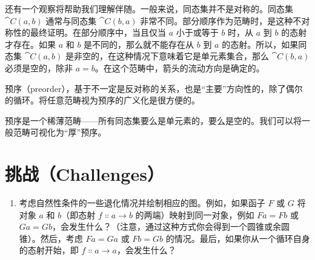 还有一个观察将帮助我们理解伴随。一般来说，同态集并不是对称的。同态集 $\cat{C}(a, b)$ 通常与同态集 $\cat{C}(b, a)$ 非常不同。部分顺序作为范畴时，是这种不对称性的最终证明。在部分顺序中，当且仅当 $a$ 小于或等于 $b$ 时，从 $a$ 到 $b$ 的态射才存在。如果 $a$ 和 $b$ 是不同的，那么就不能存在从 $b$ 到 $a$ 的态射。所以，如果同态集 $\cat{C}(a, b)$ 是非空的，在这种情况下意味着它是单元素集合，那么 $\cat{C}(b, a)$ 必须是空的，除非 $a = b$。在这个范畴中，箭头的流动方向是确定的。

预序（preorder），基于不一定是反对称的关系，也是“主要”方向性的，除了偶尔的循环。将任意范畴视为预序的广义化是很方便的。

预序是一个稀薄范畴——所有同态集要么是单元素的，要么是空的。我们可以将一般范畴可视化为“厚”预序。

\section{挑战（Challenges）}

\begin{enumerate}
  \tightlist
  \item
  考虑自然性条件的一些退化情况并绘制相应的图。例如，如果函子 $F$ 或 $G$ 将对象 $a$ 和 $b$（即态射 $f \Colon a \to b$ 的两端）映射到同一对象，例如 $F a = F b$ 或 $G a = G b$，会发生什么？（注意，通过这种方式你会得到一个圆锥或余圆锥）。然后，考虑 $F a = G a$ 或 $F b = G b$ 的情况。最后，如果你从一个循环自身的态射开始，即 $f \Colon a \to a$，会发生什么？
\end{enumerate}
